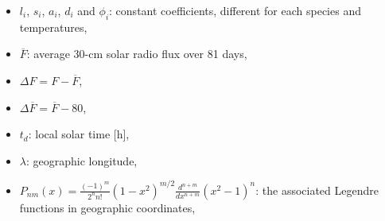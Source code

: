 \documentclass[referee,a4paper,12pt,traditabstract]{swsc}
\begin{document}
\begin{linenumbers}
\begin{itemize}
\item $l_i$, $s_i$, $a_i$, $d_i$ and $\phi_i$: constant coefficients, different for each species and temperatures,
\item $\overline{F}$: average 30-cm solar radio flux over 81 days,
\item $\Delta F = F - \overline{F}$,
\item $\Delta \overline{F} = \overline{F} - 80$,
\item $t_d$: local solar time [h],
\item $\lambda$: geographic longitude,
\item $P_{nm}(x) = \frac{(-1)^m}{2^n n!} (1-x^2)^{m/2} \frac{d^{n+m}}{d x^{n+m}} (x^2 - 1)^n$: the associated Legendre functions in geographic coordinates,
\end{itemize}




\end{linenumbers}
\end{document}
